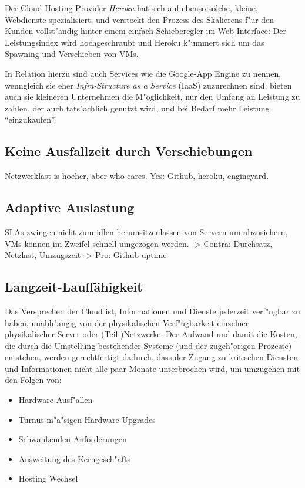 \documentclass[draft,journal]{IEEEtran}
\begin{document}
Der Cloud-Hosting Provider \emph{Heroku} hat sich auf ebenso solche,
kleine, Webdienste spezialisiert, und versteckt den Prozess des
Skalierens f"ur den Kunden vollst"andig hinter einem einfach
Schieberegler im Web-Interface: Der Leistungsindex wird hochgeschraubt
und Heroku k"ummert sich um das Spawning und Verschieben von VMs.

In Relation hierzu sind auch Services wie die Google-App Engine zu
nennen, wenngleich sie eher \emph{Infra-Structure as a Service}
(IaaS) zuzurechnen sind, bieten auch sie kleineren Unternehmen die
M"oglichkeit, nur den Umfang an Leistung zu zahlen, der auch
tats"achlich genutzt wird, und bei Bedarf mehr Leistung
"`einzukaufen"'.

\subsection{Keine Ausfallzeit durch Verschiebungen}
\label{sec:keine-ausfallzeit}
Netzwerklast is hoeher, aber who cares.
Yes: Github, heroku, engineyard.

\subsection{Adaptive Auslastung}
\label{sec:adaptive-auslastung}
SLAs zwingen nicht zum idlen herumsitzenlassen von Servern um
abzusichern, VMs können im Zweifel schnell umgezogen werden.
-> Contra: Durchsatz, Netzlast, Umzugszeit
-> Pro: Github uptime

\subsection{Langzeit-Lauffähigkeit}
\label{sec:langz-lauff}
Das Versprechen der Cloud ist, Informationen und Dienste jederzeit
verf"ugbar zu haben, unabh"angig von der physikalischen Verf"ugbarkeit
einzelner physikalischer Server oder (Teil-)Netzwerke. Der Aufwand und
damit die Kosten, die durch die Umstellung bestehender Systeme (und
der zugeh"origen Prozesse) entstehen, werden gerechtfertigt dadurch,
dass der Zugang zu kritischen Diensten und Informationen nicht alle
paar Monate unterbrochen wird, um umzugehen mit den Folgen von:
\begin{itemize}
\item Hardware-Ausf"allen
\item Turnus-m"a"sigen Hardware-Upgrades
\item Schwankenden Anforderungen
\item Ausweitung des Kerngesch"afts
\item Hosting Wechsel
\end{itemize}
\end{document}
